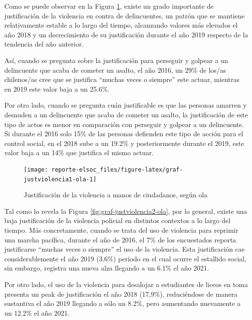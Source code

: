 \documentclass[
  12pt,
]{book}
\begin{document}
Como se puede observar en la Figura \ref{fig:graf-justviolencia1-ola}, existe un grado importante de justificación de la violencia en contra de delincuentes, un patrón que se mantiene relativamente estable a lo largo del tiempo, alcanzando valores más elevados el año 2018 y un decrecimiento de su justificación durante el año 2019 respecto de la tendencia del año anterior.

Así, cuando se pregunta sobre la justificación para perseguir y golpear a un delincuente que acaba de cometer un asalto, el año 2016, un 29\% de los/as chilenos/as cree que se justifica ``muchas veces o siempre'' este actuar, mientras en 2019 este valor baja a un 25.6\%.

Por otro lado, cuando se pregunta cuán justificable es que las personas amarren y desnuden a un delincuente que acaba de cometer un asalto, la justificación de este tipo de actos es menor en comparación con perseguir y golpear a un delincuente. Si durante el 2016 solo 15\% de las personas defienden este tipo de acción para el control social, en el 2018 sube a un 19.2\% y posteriormente durante el 2019, este valor baja a un 14\% que justifica el mismo actuar.

\begin{figure}

{\centering \texttt{[image: reporte-elsoc\_files/figure-latex/graf-justviolencia1-ola-1]} 

}

\caption{Justificación de la violencia a manos de ciudadanos, según ola}\label{fig:graf-justviolencia1-ola}
\end{figure}

Tal como lo revela la Figura \ref{fig:graf-justviolencia2-ola}, por lo general, existe una baja justificación de la violencia policial en distintos contextos a lo largo del tiempo. Más concretamente, cuando se trata del uso de violencia para reprimir una marcha pacífica, durante el año de 2016, el 7\% de los encuestados reporta justificarse ``muchas veces o siempre'' el uso de la violencia. Esta justificación cae considerablemente el año 2019 (3.6\%) periodo en el cual ocurre el estallido social, sin embargo, registra una nueva alza llegando a un 6.1\% el año 2021.

Por otro lado, el uso de la violencia para desalojar a estudiantes de liceos en toma presenta un peak de justificación el año 2018 (17,9\%), reduciéndose de manera sustantiva el año 2019 llegando a sólo un 8.2\%, pero aumentando nuevamente a un 12.2\% el año 2021.
\end{document}
